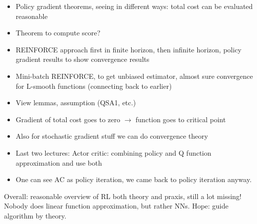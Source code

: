 \begin{itemize}
    \item Policy gradient theorems, seeing in different ways: total cost can be evaluated reasonable 
    \item Theorem to compute score?
    \item REINFORCE approach first in finite horizon, then infinite horizon, policy gradient results to show convergence results 
    \item Mini-batch REINFORCE, to get unbiased estimator, almost sure convergence for L-smooth functions (connecting back to earlier)
    \item View lemmas, assumption (QSA1, etc.)
    \item Gradient of total cost goes to zero \(\to \) function goes to critical point
    \item Also for stochastic gradient stuff we can do convergence theory 
    \item Last two lectures: Actor critic: combining policy and Q function approximation and use both 
    \item One can see AC as policy iteration, we came back to policy iteration anyway.
\end{itemize}

Overall: reasonable overview of RL both theory and praxis, still a lot missing! Nobody does linear function approximation, but rather NNs.
Hope: guide algorithm by theory.

